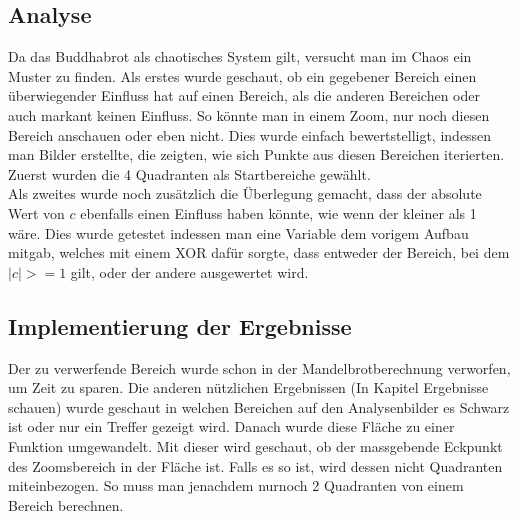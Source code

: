 \subsection{Analyse}
Da das Buddhabrot als chaotisches System gilt, versucht man im Chaos ein Muster zu finden. Als erstes wurde geschaut, ob ein gegebener Bereich einen überwiegender Einfluss hat auf einen Bereich, als die anderen Bereichen oder auch markant keinen Einfluss. So könnte man in einem Zoom, nur noch diesen Bereich anschauen oder eben nicht. Dies wurde einfach bewertstelligt, indessen man Bilder erstellte, die zeigten, wie sich Punkte aus diesen Bereichen iterierten. Zuerst wurden die 4 Quadranten als Startbereiche gewählt.
\\
Als zweites wurde noch zusätzlich die Überlegung gemacht, dass der absolute Wert von $c$ ebenfalls einen Einfluss haben könnte, wie wenn der kleiner als 1 wäre. Dies wurde getestet indessen man eine Variable dem vorigem Aufbau mitgab, welches mit einem XOR dafür sorgte, dass entweder der Bereich, bei dem $|c|>=1$ gilt, oder der andere ausgewertet wird. 
\subsection{Implementierung der Ergebnisse}
Der zu verwerfende Bereich wurde schon in der Mandelbrotberechnung verworfen, um Zeit zu sparen. Die anderen nützlichen Ergebnissen (In Kapitel Ergebnisse schauen) wurde geschaut in welchen Bereichen auf den Analysenbilder es Schwarz ist oder nur ein Treffer gezeigt wird. Danach wurde diese Fläche zu einer Funktion umgewandelt. Mit dieser wird geschaut, ob der massgebende Eckpunkt des Zoomsbereich in der Fläche ist. Falls es so ist, wird dessen nicht Quadranten miteinbezogen. So muss man jenachdem nurnoch 2 Quadranten von einem Bereich berechnen.